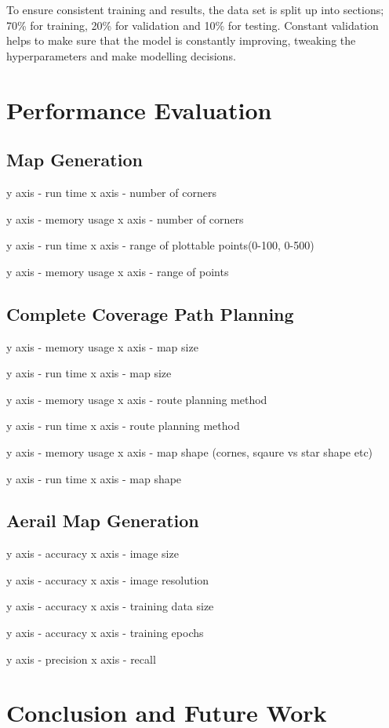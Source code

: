 \documentclass[final]{cmpreport_02}
\begin{document}
To ensure consistent training and results, the data set is split up into sections; 70\% for training, 20\% for validation and 10\% for testing.
Constant validation helps to make sure that the model is constantly improving, tweaking the hyperparameters and make modelling decisions.
\section{Performance Evaluation}

\subsection{Map Generation}

y axis - run time
x axis - number of corners

y axis - memory usage
x axis - number of corners

y axis - run time
x axis - range of plottable points(0-100, 0-500)

y axis - memory usage
x axis - range of points

\subsection{Complete Coverage Path Planning}

y axis - memory usage
x axis - map size

y axis - run time
x axis - map size

y axis - memory usage
x axis - route planning method

y axis - run time
x axis - route planning method

y axis - memory usage
x axis - map shape (cornes, sqaure vs star shape etc)

y axis - run time
x axis - map shape

\subsection{Aerail Map Generation}

y axis - accuracy
x axis - image size

y axis - accuracy
x axis - image resolution

y axis - accuracy
x axis - training data size

y axis - accuracy
x axis - training epochs

y axis - precision
x axis - recall
\section{Conclusion and Future Work}
\end{document}
